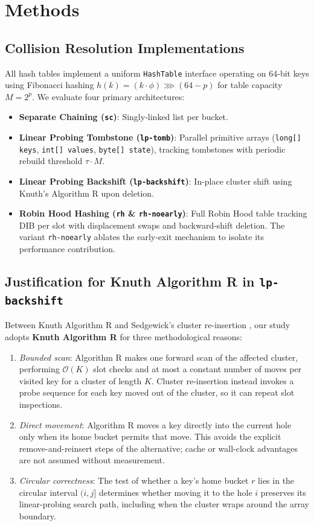 \documentclass[conference]{IEEEtran}
\begin{document}
\section{Methods}
\subsection{Collision Resolution Implementations}
All hash tables implement a uniform \texttt{HashTable} interface operating on 64-bit keys using Fibonacci hashing $h(k) = (k \cdot \phi) \ggg (64 - p)$ for table capacity $M = 2^p$. We evaluate four primary architectures:
\begin{itemize}
    \item \textbf{Separate Chaining (\texttt{sc})}: Singly-linked list per bucket.
    \item \textbf{Linear Probing Tombstone (\texttt{lp-tomb})}: Parallel primitive arrays (\texttt{long[] keys}, \texttt{int[] values}, \texttt{byte[] state}), tracking tombstones with periodic rebuild threshold $\tau \cdot M$.
    \item \textbf{Linear Probing Backshift (\texttt{lp-backshift})}: In-place cluster shift using Knuth's Algorithm R upon deletion.
    \item \textbf{Robin Hood Hashing (\texttt{rh} \& \texttt{rh-noearly})}: Full Robin Hood table tracking DIB per slot with displacement swaps and backward-shift deletion. The variant \texttt{rh-noearly} ablates the early-exit mechanism to isolate its performance contribution.
\end{itemize}

\subsection{Justification for Knuth Algorithm R in \texttt{lp-backshift}}
Between Knuth Algorithm R \cite{knuth} and Sedgewick's cluster re-insertion \cite{sedgewick}, our study adopts \textbf{Knuth Algorithm R} for three methodological reasons:
\begin{enumerate}
    \item \textit{Bounded scan}: Algorithm R makes one forward scan of the affected cluster, performing $\mathcal{O}(K)$ slot checks and at most a constant number of moves per visited key for a cluster of length $K$. Cluster re-insertion instead invokes a probe sequence for each key moved out of the cluster, so it can repeat slot inspections.
    \item \textit{Direct movement}: Algorithm R moves a key directly into the current hole only when its home bucket permits that move. This avoids the explicit remove-and-reinsert steps of the alternative; cache or wall-clock advantages are not assumed without measurement.
    \item \textit{Circular correctness}: The test of whether a key's home bucket $r$ lies in the circular interval $(i,j]$ determines whether moving it to the hole $i$ preserves its linear-probing search path, including when the cluster wraps around the array boundary.
\end{enumerate}
\end{document}
